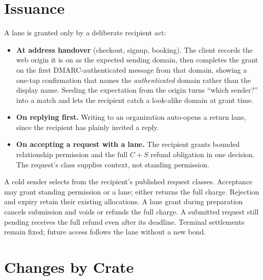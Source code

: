 \documentclass[11pt]{article}
\begin{document}
\section{Issuance}

A lane is granted only by a deliberate recipient act:

\begin{itemize}[leftmargin=2em]
    \item \textbf{At address handover} (checkout, signup, booking). The client
    records the web origin it is on as the expected sending domain, then completes
    the grant on the first DMARC-authenticated message from that domain, showing a
    one-tap confirmation that names the \emph{authenticated} domain rather than
    the display name. Seeding the expectation from the origin turns ``which
    sender?'' into a match and lets the recipient catch a look-alike domain at
    grant time.
    \item \textbf{On replying first.} Writing to an organization auto-opens a
    return lane, since the recipient has plainly invited a reply.
    \item \textbf{On accepting a request with a lane.} The recipient grants
    bounded relationship permission and the full $C+S$ refund obligation in one
    decision. The request's class supplies context, not standing permission.
\end{itemize}

A cold sender selects from the recipient's published request classes. Acceptance
may grant standing permission or a lane; either returns the full charge. Rejection
and expiry retain their existing allocations. A lane grant during preparation
cancels submission and voids or refunds the full charge. A submitted request still
pending receives the full refund even after its deadline. Terminal settlements
remain fixed; future access follows the lane without a new bond.

\section{Changes by Crate}
\end{document}
